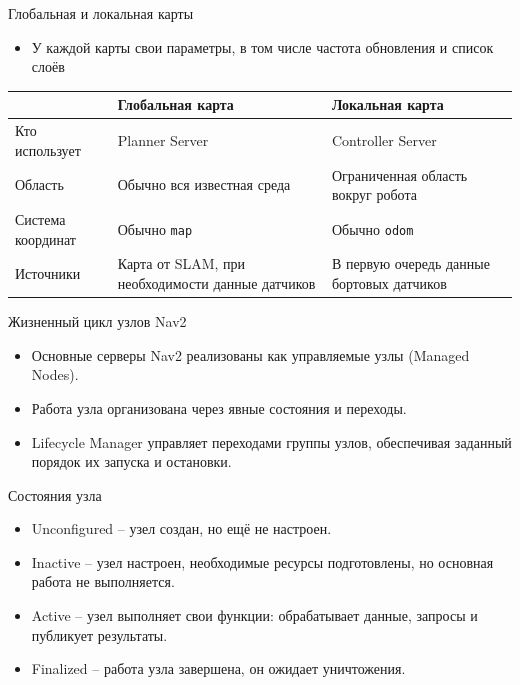 \documentclass[aspectratio=169]{beamer}
\newcommand{\term}[1]{{\textcolor{HSEblue}{#1}}}
\newcommand{\cmd}[1]{\textcolor{HSEblue}{\texttt{#1}}}
\begin{document}
\begin{frame}{Глобальная и локальная карты}
\small
\begin{itemize}
  \item У каждой карты свои параметры, в том числе частота обновления и список слоёв
\end{itemize}
\medskip
\centering
\renewcommand{\arraystretch}{1.42}
\begin{tabular}{@{}>{\raggedright\arraybackslash}p{2.6cm}>{\raggedright\arraybackslash}p{4.8cm}>{\raggedright\arraybackslash}p{4.9cm}@{}}
\toprule
 & \term{Глобальная карта} & \term{Локальная карта} \\
\midrule
Кто использует & Planner Server & Controller Server \\
Область & Обычно вся известная среда & Ограниченная область вокруг робота \\
Система координат & Обычно \cmd{map} & Обычно \cmd{odom} \\
Источники & Карта от SLAM, при необходимости данные датчиков & В первую очередь данные бортовых датчиков \\
\bottomrule
\end{tabular}
\par\medskip

\end{frame}


\begin{frame}[fragile]{Жизненный цикл узлов Nav2}
  \small
  \begin{itemize}
    \item Основные серверы Nav2 реализованы как управляемые узлы
          (\term{Managed Nodes}).
    \item Работа узла организована через явные состояния и переходы.
    \item \term{Lifecycle Manager} управляет переходами группы узлов,
          обеспечивая заданный порядок их запуска и остановки.
  \end{itemize}

  \begin{block}{Состояния узла}
  \begin{itemize}
      \item \term{Unconfigured} -- узел создан, но ещё не настроен.
      \item \term{Inactive} -- узел настроен, необходимые ресурсы
            подготовлены, но основная работа не выполняется.
      \item \term{Active} -- узел выполняет свои функции: обрабатывает
            данные, запросы и публикует результаты.
      \item \term{Finalized} -- работа узла завершена, он ожидает
            уничтожения.
  \end{itemize}
\end{block}
\end{frame}
\end{document}
